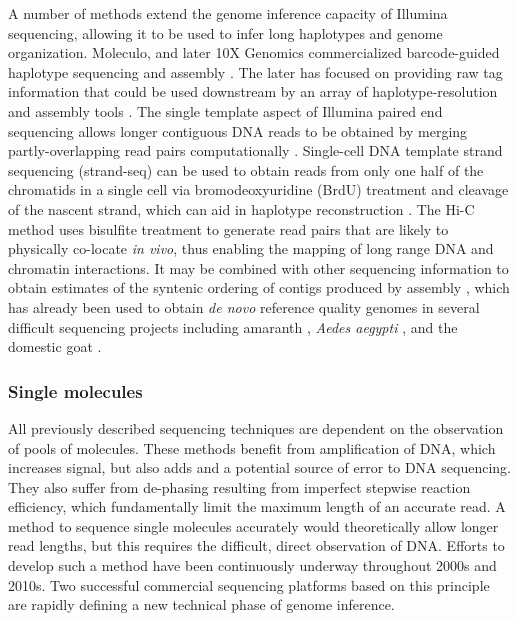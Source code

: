\documentclass[a4paper,12pt,numbered,oneside]{Classes/PhDThesisPSnPDF}
\begin{document}
A number of methods extend the genome inference capacity of Illumina sequencing, allowing it to be used to infer long haplotypes and genome organization.
Moleculo, and later 10X Genomics commercialized barcode-guided haplotype sequencing and assembly \cite{zheng2016haplotyping}.
The later has focused on providing raw tag information that could be used downstream by an array of haplotype-resolution and assembly tools \cite{mostovoy2016hybrid}.
The single template aspect of Illumina paired end sequencing allows longer contiguous DNA reads to be obtained by merging partly-overlapping read pairs computationally \cite{magovc2011flash}.
Single-cell DNA template strand sequencing (strand-seq) can be used to obtain reads from only one half of the chromatids in a single cell \cite{falconer2012dna} via bromodeoxyuridine (BrdU) treatment and cleavage of the nascent strand, which can aid in haplotype reconstruction \cite{porubsky2016direct}.
The Hi-C method \cite{lieberman2009comprehensive} uses bisulfite treatment to generate read pairs that are likely to physically co-locate \emph{in vivo}, thus enabling the mapping of long range DNA and chromatin interactions.
It may be combined with other sequencing information to obtain estimates of the syntenic ordering of contigs produced by assembly \cite{ghurye2018integrating}, which has already been used to obtain \emph{de novo} reference quality genomes in several difficult sequencing projects including amaranth \cite{lightfoot2017single}, \emph{Aedes aegypti} \cite{dudchenko2017novo}, and the domestic goat \cite{bickhart2017single}.

\subsubsection{Single molecules}

All previously described sequencing techniques are dependent on the observation of pools of molecules.
These methods benefit from amplification of DNA, which increases signal, but also adds and a potential source of error to DNA sequencing.
They also suffer from de-phasing resulting from imperfect stepwise reaction efficiency, which fundamentally limit the maximum length of an accurate read.
A method to sequence single molecules accurately would theoretically allow longer read lengths, but this requires the difficult, direct observation of DNA.
Efforts to develop such a method have been continuously underway throughout 2000s and 2010s.
Two successful commercial sequencing platforms based on this principle are rapidly defining a new technical phase of genome inference.
\end{document}
